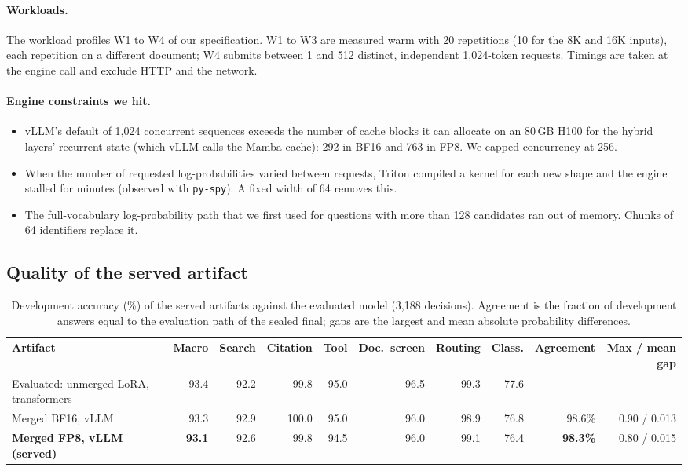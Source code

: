 \paragraph{Workloads.}
The workload profiles W1 to W4 of our specification. W1 to W3 are measured warm with 20 repetitions (10 for the 8K and
16K inputs), each repetition on a different document; W4 submits between 1 and 512 distinct,
independent 1,024-token requests. Timings are taken at the engine call and exclude HTTP and the
network.

\paragraph{Engine constraints we hit.}
\begin{itemize}
  \item vLLM's default of 1,024 concurrent sequences exceeds the number of cache blocks it can
    allocate on an 80\,GB H100 for the hybrid layers' recurrent state (which vLLM calls the
    Mamba cache): 292 in BF16 and 763 in FP8. We capped concurrency at 256.
  \item When the number of requested log-probabilities varied between requests, Triton
    compiled a kernel for each new shape and the engine stalled for minutes (observed with
    \texttt{py-spy}). A fixed width of 64 removes this.
  \item The full-vocabulary log-probability path that we first used for questions with more
    than 128 candidates ran out of memory. Chunks of 64 identifiers replace it.
\end{itemize}

\subsection{Quality of the served artifact}
\label{sec:engine_quality}

\begin{table}[t]
\centering
\small
\caption{Development accuracy (\%) of the served artifacts against the evaluated model
(3,188 decisions). Agreement is the fraction of development answers equal to the evaluation
path of the sealed final; gaps are the largest and mean absolute probability differences.}
\label{tab:engine_quality}
\setlength{\tabcolsep}{3.5pt}
\begin{adjustbox}{max width=\linewidth}
\begin{tabular}{@{}lrrrrrrrrr@{}}
\toprule
Artifact & Macro & Search & Citation & Tool & Doc.\ screen & Routing & Class. & Agreement & Max / mean gap \\
\midrule
Evaluated: unmerged LoRA, transformers & 93.4 & 92.2 & 99.8 & 95.0 & 96.5 & 99.3 & 77.6 & -- & -- \\
Merged BF16, vLLM & 93.3 & 92.9 & 100.0 & 95.0 & 96.0 & 98.9 & 76.8 & 98.6\% & 0.90 / 0.013 \\
\textbf{Merged FP8, vLLM (served)} & \textbf{93.1} & 92.6 & 99.8 & 94.5 & 96.0 & 99.1 & 76.4 & \textbf{98.3\%} & 0.80 / 0.015 \\
\bottomrule
\end{tabular}
\end{adjustbox}
\end{table}

